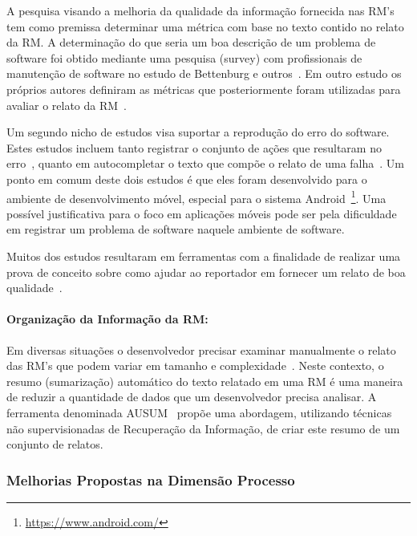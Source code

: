 A pesquisa visando a melhoria da qualidade da informação fornecida nas RM's tem
como premissa determinar uma métrica com base no texto contido no relato da
RM\@. A determinação do que seria um boa descrição de um problema de software
foi obtido mediante uma pesquisa (survey) com profissionais de manutenção de
software no estudo de Bettenburg e outros~\cite{Bettenburg2008a}. Em outro
estudo os próprios autores definiram as métricas que posteriormente foram
utilizadas para avaliar o relato da RM~\cite{Tu:2014:MQI:2677832.2677844}.

Um segundo nicho de estudos visa suportar a reprodução do erro do software.
Estes estudos incluem tanto registrar o conjunto de ações que resultaram no
erro~\cite{White:2015:GRR:2820282.2820291}, quanto em autocompletar o texto que
compõe o relato de uma falha~\cite{moran2015auto}. Um ponto em comum deste dois
estudos é que eles foram desenvolvido para o ambiente de desenvolvimento móvel,
especial para o sistema Android~\footnote{\url{https://www.android.com/}}. Uma
possível justificativa para o foco em aplicações móveis pode ser pela
dificuldade em registrar um problema de software naquele ambiente de software.

Muitos dos estudos resultaram em ferramentas com a finalidade de realizar uma
prova de conceito sobre como ajudar ao reportador em fornecer um relato de boa
qualidade~\cite{Tu:2014:MQI:2677832.2677844, Bettenburg2008a,
	Wu2011a,White:2015:GRR:2820282.2820291,moran2015auto}.

\paragraph{Organização da Informação da RM:}

Em diversas situações o desenvolvedor precisar examinar manualmente o relato das
RM's que podem variar em tamanho e complexidade~\cite{mani2012ausum}.  Neste
contexto, o resumo (sumarização) automático do texto relatado em uma RM é uma
maneira de reduzir a quantidade de dados que um desenvolvedor precisa analisar.
A ferramenta denominada AUSUM~\cite{mani2012ausum} propõe uma abordagem,
utilizando técnicas não supervisionadas de Recuperação da Informação, de criar
este resumo de um conjunto de relatos.

\subsubsection{Melhorias Propostas na Dimensão Processo}
\label{ssub:melhorias_dim_processo}

